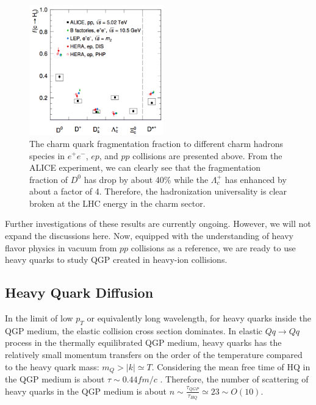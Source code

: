  \begin{figure}[hbtp]
\begin{center}
\includegraphics[width=0.52\textwidth]{Figures/Chapter1/ALICECharmFF.png}
\caption{The charm quark fragmentation fraction to different charm hadrons species in $e^+e^-$, $ep$, and $pp$ collisions are presented above. From the ALICE experiment, we can clearly see that the fragmentation fraction of $D^0$ has drop by about 40\% while the $\Lambda_c^+$ has enhanced by about a factor of 4. Therefore, the hadronization universality is clear broken at the LHC energy in the charm sector.}
\label{CharmFFALICE}
\end{center}
\end{figure}   

Further investigations of these results are currently ongoing. However, we will not expand the discussions here. Now, equipped with the understanding of heavy flavor physics in vacuum from $pp$ collisions as a reference, we are ready to use heavy quarks to study QGP created in heavy-ion collisions. 

\subsection{Heavy Quark Diffusion}

In the limit of low $p_T$ or equivalently long wavelength, for heavy quarks inside the QGP medium, the elastic collision cross section dominates. In elastic $Q q \rightarrow Q q$ process in the thermally equilibrated QGP medium, heavy quarks has the relatively small momentum transfers on the order of the temperature compared to the heavy quark mass: $m_Q > |k| \simeq T$. Considering the mean free time of HQ in the QGP medium is about $\tau \sim 0.44 fm/c$ \cite{HQTau}. Therefore, the number of scattering of heavy quarks in the QGP medium is about $n \sim \frac{\tau_{QGP}}{\tau_{HQ}} \simeq 23 \sim O(10)$.


